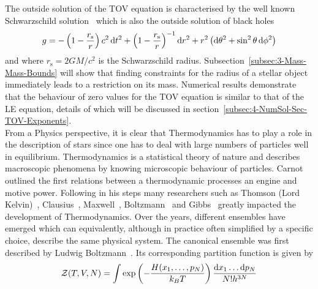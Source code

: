 The outside solution of the \ac{TOV} equation is characterised by the well known Schwarzschild solution~\cite{schwarzschildUberGravitationsfeldMassenpunktes1916} which is also the outside solution of black holes
\begin{equation}
	g=-\left(1-\frac{r_{\mathrm{s}}}{r}\right) c^{2} \mathop{}\!\mathrm{d} t^{2}+\left(1-\frac{r_{\mathrm{s}}}{r}\right)^{-1} \mathop{}\!\mathrm{d} r^{2}+r^{2}\left( \mathop{}\!\mathrm{d}\theta^2+\sin^2\theta \mathop{}\!\mathrm{d}\phi^2\right)
	\label{eq:01-Intr-Schwarzschild-Metric}
\end{equation}
and where $r_\mathrm{s}=2GM/c^2$ is the Schwarzschild radius.
Subsection~\ref{subsec:3-Mass-Mass-Bounds} will show that finding constraints for the radius of a stellar object immediately leads to a restriction on its mass.
Numerical results demonstrate that the behaviour of zero values for the \ac{TOV} equation is similar to that of the \ac{LE} equation, details of which will be discussed in section~\ref{subsec:4-NumSol-Sec-TOV-Exponents}.\\
From a Physics perspective, it is clear that Thermodynamics has to play a role in the description of stars since one has to deal with large numbers of particles well in equilibrium.
Thermodynamics is a statistical theory of nature and describes macroscopic phenomena by knowing microscopic behaviour of particles.
Carnot~\cite{carnotReflexionsPuissanceMotrice1824} outlined the first relations between a thermodynamic processes an engine and motive power.
Following in his steps many researchers such as Thomson (Lord Kelvin)~\cite{thomsonABSOLUTETHERMOMETRICSCALE2011}, Clausius~\cite{clausiusMechanischeWaermetheorie1876}, Maxwell~\cite{maxwellScientificLettersPapers2002}, Boltzmann~\cite{boltzmannUberMechanischeBedeutung1866} and Gibbs~\cite{gibbsElementaryPrinciplesStatistical2010} greatly impacted the development of Thermodynamics.
Over the years, different ensembles have emerged which can equivalently, although in practice often simplified by a specific choice, describe the same physical system.
The canonical ensemble was first described by Ludwig Boltzmann~\cite{boltzmannUeberEigenschaftenMonocyclischer1885a}.
Its corresponding partition function is given by
\begin{equation}
	\mathcal{Z}(T,V,N) = \int\exp\left(-\frac{H(x_1,\dots,p_N)}{k_B T}\right)\frac{\mathop{}\!\mathrm{d} x_1\dots \mathop{}\!\mathrm{d} p_N}{N!h^{3N}}
	\label{eq:01-Intr-Canocnical-Ens-Part-Funct}
\end{equation}
